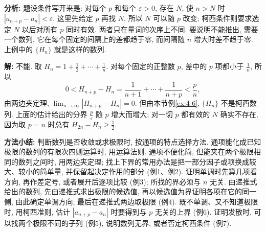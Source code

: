 \documentclass[UTF8,openany]{ctexbook}
\theoremstyle{chinesetextbook}
\newenvironment{cnsolution}{\par\indent\textbf{解:} \ignorespaces}{\par}
\begin{document}
\par\indent\textbf{分析:} 题设条件写开来是: 对每个 $p$ 和每个 $\varepsilon>0$, 存在 $N$, 使 $n>N$ 时 $|a_{n+p}-a_n|<\varepsilon$. 这里先给定 $p$ 再找 $N$, 所以 $N$ 可以随 $p$ 改变; 柯西条件则要求选定 $N$ 以后对所有 $p$ 同时有效. 两者只在量词的次序上不同. 要说明不能推出, 需要一个数列, 它在每个固定的间隔上的差都趋于零, 而间隔随 $n$ 增大时差不趋于零. 上例中的 $\{H_n\}$ 就是这样的数列.
\begin{cnsolution}
不能. 取 $\displaystyle H_n=1+\frac12+\cdots+\frac1n$. 对每个固定的正整数 $p$, 差中的 $p$ 项都小于 $\displaystyle\frac1n$, 所以
\[
0<H_{n+p}-H_n=\frac1{n+1}+\cdots+\frac1{n+p}<\frac pn,
\]
由两边夹定理, $\displaystyle\lim_{n\to\infty}|H_{n+p}-H_n|=0$. 但由本节例\ref{ex:4-6}, $\{H_n\}$ 不是柯西数列. 上面的估计给出的分界 $\displaystyle\frac p\varepsilon$ 随 $p$ 增大而增大; 对一切 $p$ 都有效的 $N$ 确实不存在, 因为取 $p=n$ 时总有 $\displaystyle H_{2n}-H_n\ge\frac12$.
\end{cnsolution}
\par\indent\textbf{方法小结:} 判断数列是否收敛或求极限时, 按通项的特点选择方法. 通项能化成已知极限的数列的有限次四则运算时, 用运算法则. 通项不便化简, 但能夹在两个极限相同的数列之间时, 用两边夹定理; 找上下界的常用办法是把一部分因子或项换成较大、较小的简单量, 并保留起决定作用的部分 (例1、例2). 证明单调时先算几项看方向, 再作差定号, 或者展开后逐项比较 (例3); 所找的界必须与 $n$ 无关. 由递推式给出的数列, 先由递推式求出极限的候选值, 再以候选值为界证明各项在它的同一侧, 由此确定单调方向, 最后在递推式两边取极限 (例4). 既不单调、又不知道极限时, 用柯西准则, 估计 $|a_{n+p}-a_n|$ 时要得到与 $p$ 无关的上界 (例6). 证明发散时, 可以找两个极限不同的子列 (例5), 说明数列无界, 或者否定柯西条件 (例7).
\end{document}
